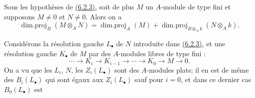 \begin{proposition}[6.2.4]
\label{IV.6.2.4}
Sous les hypothèses de {\hyperref[canon-index.ega4.c04.prop.6-2-3]{(6.2.3)}}, soit
de plus $M$ un $A$-module de type fini et supposons $M\neq0$ et
$N\neq0$. Alors on a
\begin{equation}
 \operatorname{dim.proj}_B(M\otimes_AN)=
 \operatorname{dim.proj}_A(M)+
 \operatorname{dim.proj}_{B\otimes_Ak}(N\otimes_Ak).
 \label{IV.6.2.4.1}\tag{6.2.4.1}
\end{equation}
\end{proposition}

Considérons la résolution gauche $L_\bullet$ de $N$ introduite dans
{\hyperref[canon-index.ega4.c04.prop.6-2-3]{(6.2.3)}}, et une résolution gauche
$K_\bullet$ de $M$ par des $A$-modules libres de type fini :
\[
 \cdots\longrightarrow K_i\longrightarrow K_{i-1}\longrightarrow
 \cdots\longrightarrow K_0\longrightarrow M\longrightarrow0.
\]
On a vu que les $L_i$, $N$, les $Z_i(L_\bullet)$ sont des $A$-modules
plats; il en est de même des $B_i(L_\bullet)$ qui sont égaux aux
$Z_i(L_\bullet)$ sauf pour $i=0$, et dans ce dernier cas
$B_0(L_\bullet)$ est

